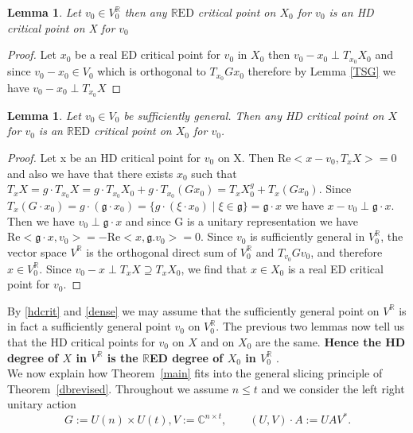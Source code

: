 \documentclass[11pt]{amsart}
\theoremstyle{plain}
\newtheorem{lemma}[theorem]{Lemma}
\theoremstyle{definition}
\theoremstyle{remark}
\begin{document}
\begin{lemma}
    Let $v_0 \in V_0^\mathbb{R}$ then any $\mathrm{\mathbb{R}ED}$ critical point on $X_0$ for $v_0$ is an HD critical point on X for $v_0$
\end{lemma}
\begin{proof}
    Let $x_0$ be a real ED critical point for $v_0$ in $X_0$ then $v_0 -x_0 \perp T_{x_0}X_0$ and since $v_0-x_0\in V_0$ which is orthogonal to $T_{x_0}Gx_0$ therefore by Lemma \ref{TSG} we have $v_0-x_0\perp T_{x_0}X$
\end{proof}
\begin{lemma}
    Let $v_{0} \in V_{0}$ be sufficiently general. Then any  HD critical point on $X$ for $v_{0}$ is
an $\mathrm{\mathbb{R}ED}$ critical point on $X_{0}$ for $v_{0}$.
\end{lemma}
\begin{proof}
Let x be an HD critical point for $v_0$ on X. Then $\mathrm{Re} <x-v_0,T_{x}X>=0$ and also we have that there exists $x_0$ such that  $T_x X = g \cdot T_{x_0} X = g \cdot T_{x_0} X_0 + g \cdot T_{x_0} (G x_0) = T_x X_0^g + T_x (G x_0)$. Since $T_x(G \cdot x_0) = g \cdot (\mathfrak{g} \cdot x_0) = \{ g \cdot (\xi \cdot x_0) \mid \xi \in \mathfrak{g} \} = \mathfrak{g} \cdot x$ we have $x-v_0 \perp \mathfrak{g} \cdot x $.    Then we have $v_0\perp \mathfrak{g} \cdot x $ and since G is a unitary representation we have $\mathrm{Re} <\mathfrak{g} \cdot x,v_0>=-\mathrm{Re} <x,\mathfrak{g}.v_0>=0. $ Since $v_0$ is sufficiently general in $V_0^\mathbb{R}$, the vector space $V^\mathbb{R}$ is the orthogonal direct sum of $V_0^\mathbb{R}$ and $T_{v_0}Gv_0$, and therefore $x \in V_0^\mathbb{R}$. Since $v_0 - x \perp T_xX \supseteq T_xX_0$, we find that $x \in X_0$ is a real ED critical point for $v_0$.



\end{proof}
By \ref{hdcrit} and \ref{dense} we may assume that the sufficiently general point on $V^\mathbb{R}$ is in fact a sufficiently general point $v_0$ on $V_0^\mathbb{R}$. The previous two lemmas now tell us that the HD critical points for $v_0$ on $X$ and on $X_0$ are the same. \textbf{Hence the HD degree of $X$ in $V^\mathbb{R}$ is the $\mathbb{R}$ED degree of $X_0$ in $V_0^\mathbb{R}$  }.\\

We now explain how Theorem~\ref{main} fits into the general slicing principle of
Theorem~\ref{dbrevised}.
Throughout we assume $n \le t$ and we consider the left right unitary action
\[
G := U(n)\times U(t) , V := \mathbb{C}^{n\times t},
\qquad (U,V)\cdot A := U A V^{*}.
\]
\end{document}
